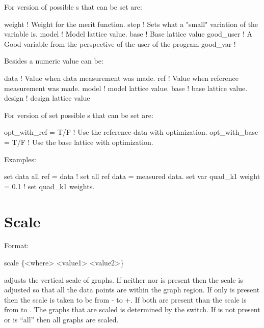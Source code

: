 For  version of  possible 
s that can be set are:
\begin{example}
  weight     ! Weight for the merit function.
  step       ! Sets what a "small" variation of the variable is.
  model      ! Model lattice value.
  base       ! Base lattice value
  good_user  ! A Good variable from the perspective of the user of the \tao program
  good_var   ! 
\end{example}
Besides a numeric value  can be:
\begin{example}
  data        ! Value when data measurement was made.
  ref         ! Value when reference measurement was made.
  model       ! model lattice value.
  base        ! base lattice value.
  design      ! design lattice value
\end{example}

For  version of set possible 
s that can be set are:
\begin{example}
  opt\_with\_ref  = T/F ! Use the reference data with optimization.
  opt\_with\_base = T/F ! Use the base lattice with optimization.
\end{example}

Examples:
\begin{example}
  set data all ref = data       ! set all ref data = measured data.
  set var quad\_k1 weight = 0.1 ! set quad\_k1 weights. 
\end{example}

\section{Scale}
\label{s:scale}

Format:
\begin{example}
  scale \{<where> <value1> <value2>\}
\end{example}

\vskip 0.2in 
 adjusts the vertical scale of graphs. If neither
 nor  is present then the scale is adjusted
so that all the data points are within the graph region.  If only
 is present then the scale is taken to be from
- to +. If both are present than the scale
is from  to .  The graphs that are scaled is
determined by the  switch. If  is not present
or  is ``all'' then all graphs are scaled.


